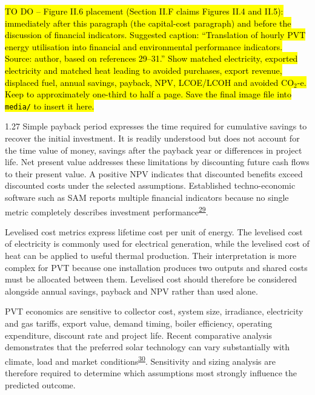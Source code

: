 \documentclass[12pt,letterpaper]{article}
\newcommand{\placeholder}[1]{\hl{#1}}
\DeclareRobustCommand{\citenum}[1]{\hyperlink{ref:#1}{#1}} %
\begin{document}
\placeholder{TO DO -- Figure II.6 placement (Section II.F claims Figures II.4 and II.5): immediately after this paragraph (the capital-cost paragraph) and before the discussion of financial indicators. Suggested caption: ``Translation of hourly PVT energy utilisation into financial and environmental performance indicators. Source: author, based on references 29--31.'' Show matched electricity, exported electricity and matched heat leading to avoided purchases, export revenue, displaced fuel, annual savings, payback, NPV, LCOE/LCOH and avoided CO$_2$-e. Keep to approximately one-third to half a page. Save the final image file into \texttt{media/} to insert it here.}

\begin{spacing}{1.27}
Simple payback period expresses the time required for cumulative savings to recover the initial investment. It is readily understood but does not account for the time value of money, savings after the payback year or differences in project life. Net present value addresses these limitations by discounting future cash flows to their present value. A positive NPV indicates that discounted benefits exceed discounted costs under the selected assumptions. Established techno-economic software such as SAM reports multiple financial indicators because no single metric completely describes investment performance\textsuperscript{\citenum{29}}.\par

\vspace{0.15in}

Levelised cost metrics express lifetime cost per unit of energy. The levelised cost of electricity is commonly used for electrical generation, while the levelised cost of heat can be applied to useful thermal production. Their interpretation is more complex for PVT because one installation produces two outputs and shared costs must be allocated between them. Levelised cost should therefore be considered alongside annual savings, payback and NPV rather than used alone.\par

\vspace{0.15in}

PVT economics are sensitive to collector cost, system size, irradiance, electricity and gas tariffs, export value, demand timing, boiler efficiency, operating expenditure, discount rate and project life. Recent comparative analysis demonstrates that the preferred solar technology can vary substantially with climate, load and market conditions\textsuperscript{\citenum{30}}. Sensitivity and sizing analysis are therefore required to determine which assumptions most strongly influence the predicted outcome.\par


\end{spacing}
\end{document}

